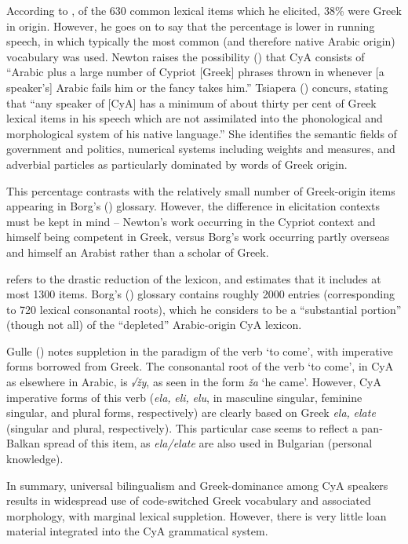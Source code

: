 \documentclass[output=paper]{langsci/langscibook}
\begin{document}
According to \citet{Newton1964}, of the 630 common lexical items which he elicited, 38\% were Greek in origin. However, he goes on to say that the percentage is lower in running speech, in which typically the most common (and therefore native Arabic origin) vocabulary was used. Newton raises the possibility (\citeyear[51]{Newton1964}) that CyA consists of “Arabic plus a large number of Cypriot [Greek] phrases thrown in whenever [a speaker’s] Arabic fails him or the fancy takes him.” Tsiapera (\citeyear[124]{Tsiapera1964}) concurs, stating that “any speaker of [CyA] has a minimum of about thirty per cent of Greek lexical items in his speech which are not assimilated into the phonological and morphological system of his native language.” She identifies the semantic fields of government and politics, numerical systems including weights and measures, and adverbial particles as particularly dominated by words of Greek origin. 

This percentage contrasts with the relatively small number of Greek-origin items appearing in Borg's (\citeyear{Borg2004}) glossary. However, the difference in elicitation contexts must be kept in mind – Newton’s work occurring in the Cypriot context and himself being competent in Greek, versus Borg’s work occurring partly overseas and himself an Arabist rather than a scholar of Greek.

\citet{Roth2004} refers to the drastic reduction of the lexicon, and estimates that it includes at most 1300 items. Borg's (\citeyear{Borg2004}) glossary contains roughly 2000 entries (corresponding to 720 lexical consonantal roots), which he considers to be a “substantial portion” (though not all) of the “depleted” Arabic-origin CyA lexicon. 

Gulle (\citeyear[45]{Gulle2016}) notes suppletion in the paradigm of the verb ‘to come’, with imperative forms borrowed from Greek. The consonantal root of the verb ‘to come’, in CyA as elsewhere in Arabic, is \textit{√žy}, as seen in the form \textit{ža} ‘he came’. However, CyA imperative forms of this verb (\textit{ela,} \textit{eli,} \textit{elu}, in masculine singular, feminine singular, and plural forms, respectively) are clearly based on Greek \textit{ela,} \textit{elate} (singular and plural, respectively). This particular case seems to reflect a pan-Balkan spread of this item, as \textit{ela/elate} are also used in Bulgarian (personal knowledge). 

In summary, universal bilingualism and Greek-dominance among CyA speakers results in widespread use of code-switched Greek vocabulary and associated morphology, with marginal lexical suppletion. However, there is very little loan material integrated into the CyA grammatical system.
\end{document}
